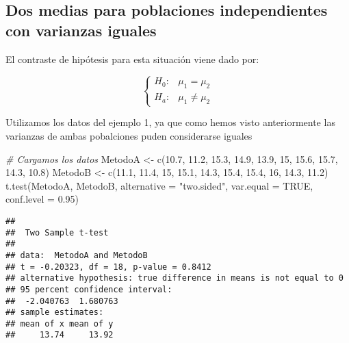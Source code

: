 \documentclass[
]{book}
\newenvironment{Shaded}{\begin{snugshade}}{\end{snugshade}}
\newcommand{\AttributeTok}[1]{\textcolor[rgb]{0.77,0.63,0.00}{#1}}
\newcommand{\CommentTok}[1]{\textcolor[rgb]{0.56,0.35,0.01}{\textit{#1}}}
\newcommand{\ConstantTok}[1]{\textcolor[rgb]{0.00,0.00,0.00}{#1}}
\newcommand{\DecValTok}[1]{\textcolor[rgb]{0.00,0.00,0.81}{#1}}
\newcommand{\FloatTok}[1]{\textcolor[rgb]{0.00,0.00,0.81}{#1}}
\newcommand{\FunctionTok}[1]{\textcolor[rgb]{0.00,0.00,0.00}{#1}}
\newcommand{\NormalTok}[1]{#1}
\newcommand{\OtherTok}[1]{\textcolor[rgb]{0.56,0.35,0.01}{#1}}
\newcommand{\StringTok}[1]{\textcolor[rgb]{0.31,0.60,0.02}{#1}}
\begin{document}
\hypertarget{dos-medias-para-poblaciones-independientes-con-varianzas-iguales}{%
\subsection{Dos medias para poblaciones independientes con varianzas iguales}\label{dos-medias-para-poblaciones-independientes-con-varianzas-iguales}}

El contraste de hipótesis para esta situación viene dado por:

\[\left\{\begin{array}{ll} H_0: & \mu_1 = \mu_2\\ H_a: & \mu_1 \neq \mu_2 \end{array}\right.\]

Utilizamos los datos del ejemplo 1, ya que como hemos visto anteriormente las varianzas de ambas pobalciones puden considerarse iguales

\begin{Shaded}
\begin{Highlighting}[]
\CommentTok{\# Cargamos los datos}
\NormalTok{MetodoA }\OtherTok{\textless{}{-}} \FunctionTok{c}\NormalTok{(}\FloatTok{10.7}\NormalTok{, }\FloatTok{11.2}\NormalTok{, }\FloatTok{15.3}\NormalTok{, }\FloatTok{14.9}\NormalTok{, }\FloatTok{13.9}\NormalTok{, }\DecValTok{15}\NormalTok{, }\FloatTok{15.6}\NormalTok{, }\FloatTok{15.7}\NormalTok{, }\FloatTok{14.3}\NormalTok{, }\FloatTok{10.8}\NormalTok{)}
\NormalTok{MetodoB }\OtherTok{\textless{}{-}} \FunctionTok{c}\NormalTok{(}\FloatTok{11.1}\NormalTok{, }\FloatTok{11.4}\NormalTok{, }\DecValTok{15}\NormalTok{, }\FloatTok{15.1}\NormalTok{, }\FloatTok{14.3}\NormalTok{, }\FloatTok{15.4}\NormalTok{, }\FloatTok{15.4}\NormalTok{, }\DecValTok{16}\NormalTok{, }\FloatTok{14.3}\NormalTok{, }\FloatTok{11.2}\NormalTok{)}
\FunctionTok{t.test}\NormalTok{(MetodoA, MetodoB, }\AttributeTok{alternative =} \StringTok{"two.sided"}\NormalTok{, }\AttributeTok{var.equal =} \ConstantTok{TRUE}\NormalTok{, }\AttributeTok{conf.level =} \FloatTok{0.95}\NormalTok{)}
\end{Highlighting}
\end{Shaded}

\begin{verbatim}
## 
##  Two Sample t-test
## 
## data:  MetodoA and MetodoB
## t = -0.20323, df = 18, p-value = 0.8412
## alternative hypothesis: true difference in means is not equal to 0
## 95 percent confidence interval:
##  -2.040763  1.680763
## sample estimates:
## mean of x mean of y 
##     13.74     13.92
\end{verbatim}
\end{document}
